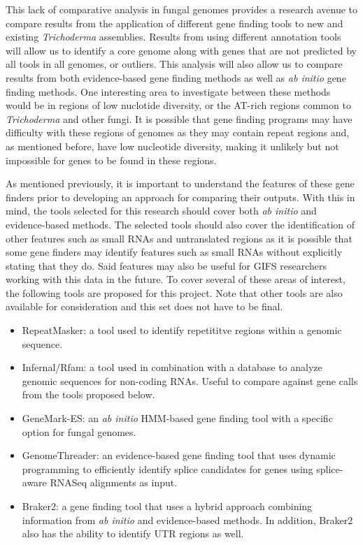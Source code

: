 \documentclass[12pt]{article}
\begin{document}
This lack of comparative analysis in fungal genomes provides a
research avenue to compare results from the application of different
gene finding tools to new and existing \textit{Trichoderma}
assemblies. Results from using different annotation tools will allow
us to identify a core genome along with genes that are not predicted
by all tools in all genomes, or outliers. This analysis will also
allow us to compare results from both evidence-based gene finding
methods as well as \textit{ab initio} gene finding methods. One
interesting area to investigate between these methods would be in
regions of low nuclotide diversity, or the AT-rich regions common to
\textit{Trichoderma} and other fungi. It is possible that gene finding
programs may have difficulty with these regions of genomes as they may
contain repeat regions and, as mentioned before, have low nucleotide
diversity, making it unlikely but not impossible for genes to be found
in these regions.

As mentioned previously, it is important to understand the features of
these gene finders prior to developing an approach for comparing their
outputs. With this in mind, the tools selected for this research
should cover both \textit{ab initio} and evidence-based methods. The
selected tools should also cover the identification of other features
such as small RNAs and untranslated regions as it is possible that
some gene finders may identify features such as small RNAs without
explicitly stating that they do. Said features may also be useful for
GIFS researchers working with this data in the future. To cover
several of these areas of interest, the following tools are proposed
for this project. Note that other tools are also available for
consideration and this set does not have to be final.

\begin{itemize}

\item RepeatMasker\cite{RepeatMasker}: a tool used to identify
  repetititve regions within a genomic sequence.
\item Infernal/Rfam\cite{Infernal}: a tool used in combination with a database to
  analyze genomic sequences for non-coding RNAs. Useful to compare
  against gene calls from the tools proposed below.
\item GeneMark-ES\cite{GeneMarkES}: an \textit{ab initio} HMM-based
  gene finding tool with a specific option for fungal genomes.
\item GenomeThreader\cite{GenomeThreader}: an evidence-based gene finding
  tool that uses dynamic programming to efficiently identify splice
  candidates for genes using splice-aware RNASeq alignments as input.
\item Braker2: a gene finding tool that uses a hybrid approach
  combining information from \textit{ab initio} and evidence-based
  methods. In addition, Braker2 also has the ability to identify UTR
  regions as well.

\end{itemize}
\end{document}
